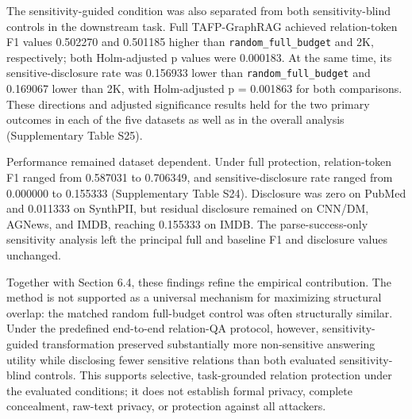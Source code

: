 \documentclass[preprint,12pt]{elsarticle}
\begin{document}
The sensitivity-guided condition was also separated from both sensitivity-blind controls in the downstream task. Full TAFP-GraphRAG achieved relation-token F1 values 0.502270 and 0.501185 higher than \nolinkurl{random_full_budget} and 2K, respectively; both Holm-adjusted p values were 0.000183. At the same time, its sensitive-disclosure rate was 0.156933 lower than \nolinkurl{random_full_budget} and 0.169067 lower than 2K, with Holm-adjusted p = 0.001863 for both comparisons. These directions and adjusted significance results held for the two primary outcomes in each of the five datasets as well as in the overall analysis (Supplementary Table S25).

Performance remained dataset dependent. Under full protection, relation-token F1 ranged from 0.587031 to 0.706349, and sensitive-disclosure rate ranged from 0.000000 to 0.155333 (Supplementary Table S24). Disclosure was zero on PubMed and 0.011333 on SynthPII, but residual disclosure remained on CNN/DM, AGNews, and IMDB, reaching 0.155333 on IMDB. The parse-success-only sensitivity analysis left the principal full and baseline F1 and disclosure values unchanged.

Together with Section 6.4, these findings refine the empirical contribution. The method is not supported as a universal mechanism for maximizing structural overlap: the matched random full-budget control was often structurally similar. Under the predefined end-to-end relation-QA protocol, however, sensitivity-guided transformation preserved substantially more non-sensitive answering utility while disclosing fewer sensitive relations than both evaluated sensitivity-blind controls. This supports selective, task-grounded relation protection under the evaluated conditions; it does not establish formal privacy, complete concealment, raw-text privacy, or protection against all attackers.
\end{document}
